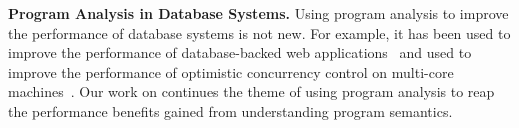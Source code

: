 \begin{techreport}

  \textbf{Program Analysis in Database Systems.} Using program analysis to
  improve the performance of database systems is not new. For example, it has
  been used to improve the performance of database-backed web
  applications~\cite{cheung2014using, wu2016transaction,
  ramachandra2012program} and used to improve the performance of optimistic
  concurrency control on multi-core machines~\cite{wu2016transaction}. Our work
  on \invariantconfluence{} continues the theme of using program analysis to
  reap the performance benefits gained from understanding program semantics.
\end{techreport}

